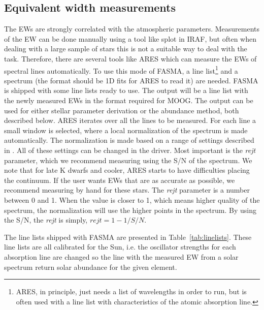 \documentclass{aa}
\begin{document}
\subsection{Equivalent width measurements}
\label{sub:EW_measurements}
The EWs are strongly correlated with the atmospheric parameters. Measurements of
the EW can be done manually using a tool like splot in IRAF, but often when
dealing with a large sample of stars this is not a suitable way to deal with the
task. Therefore, there are several tools like ARES which can measure the EWs of
spectral lines automatically. To use this mode of FASMA, a line
list\footnote{ARES, in principle, just needs a list of wavelengths in order to
run, but is often used with a line list with characteristics of the atomic
absorption line.} and a spectrum (the format should be 1D fits for ARES to read
it) are needed. FASMA is shipped with some line lists ready to use. The output
will be a line list with the newly measured EWs in the format required for MOOG.
The output can be used for either stellar parameter derivation or the abundance
method, both described below. ARES iterates over all the lines to be measured.
For each line a small window is selected, where a local normalization of the
spectrum is made automatically. The normalization is made based on a range of
settings described in \citet{Sousa2007,Sousa2015a}. All of these settings can be
changed in the driver. Most important is the \emph{rejt} parameter, which we
recommend measuring using the S/N of the spectrum. We note that for late K
dwarfs and cooler, ARES starts to have difficulties placing the continuum. If
the user wants EWs that are as accurate as possible, we recommend measuring by
hand for these stars. The \emph{rejt} parameter is a number between 0 and 1.
When the value is closer to 1, which means higher quality of the spectrum, the
normalization will use the higher points in the spectrum. By using the S/N, the
\emph{rejt} is simply, $\mathit{rejt}=1-1/S/N$.

The line lists shipped with FASMA are presented in Table~\ref{tab:linelists}.
These line lists are all calibrated for the Sun, i.e. the oscillator strengths
for each absorption line are changed so the line with the measured EW from a
solar spectrum return solar abundance for the given element.
\end{document}
